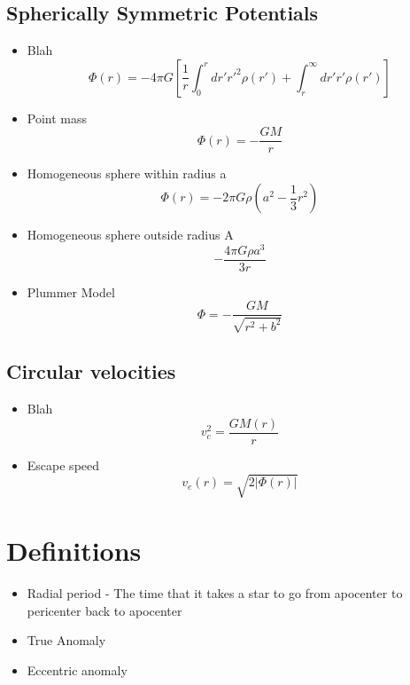 \subsection{Spherically Symmetric Potentials}
\begin{itemize}
\item Blah
\begin{equation}
\Phi(r) = -4\pi G \left[ \frac{1}{r} \int_0^r dr' r'^2 \rho(r') + \int_r^{\infty} dr' r' \rho(r')\right]
\end{equation}
\item Point mass
\begin{equation}
\Phi(r) = -\frac{GM}{r}
\end{equation}
\item Homogeneous sphere within radius a
\begin{equation}
\Phi(r) = -2\pi G \rho ( a^2 - \frac{1}{3} r^2)
\end{equation}
\item Homogeneous sphere outside radius A
\begin{equation}
-\frac{4\pi G\rho a^3}{3r}
\end{equation}
\item Plummer Model
\begin{equation}
\Phi = -\frac{GM}{\sqrt{r^2 + b^2}}
\end{equation}
\end{itemize}


\subsection{Circular velocities}
\begin{itemize}
\item Blah
\begin{equation}
v_c^2 = \frac{GM(r)}{r}
\end{equation}
\item Escape speed
\begin{equation}
v_e(r) = \sqrt{2|\Phi(r)|}
\end{equation}
\end{itemize}



\section{Definitions}
\begin{itemize}
\item Radial period - The time that it takes a star to go from apocenter to pericenter back
to apocenter
\item True Anomaly
\item Eccentric anomaly

\end{itemize}



